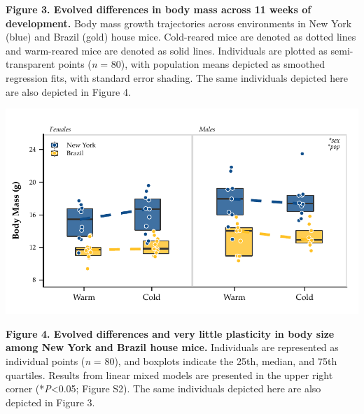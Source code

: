 \documentclass[]{article}
\begin{document}
\textbf{Figure 3. Evolved differences in body mass across 11 weeks of
development.} Body mass growth trajectories across environments in New
York (blue) and Brazil (gold) house mice. Cold-reared mice are denoted
as dotted lines and warm-reared mice are denoted as solid lines.
Individuals are plotted as semi-transparent points (\emph{n} = 80), with
population means depicted as smoothed regression fits, with standard
error shading. The same individuals depicted here are also depicted in
Figure 4.

\newpage

\includegraphics{../results/figures/RXNs_BW.pdf}

\textbf{Figure 4. Evolved differences and very little plasticity in body
size among New York and Brazil house mice.} Individuals are represented
as individual points (\emph{n} = 80), and boxplots indicate the 25th,
median, and 75th quartiles. Results from linear mixed models are
presented in the upper right corner (*\emph{P}\textless{}0.05; Figure
S2). The same individuals depicted here are also depicted in Figure 3.

\newpage
\end{document}
